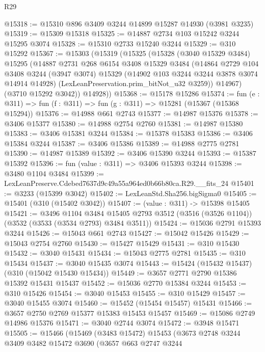 \begin{lexlean}{R29}
\begin{coremodule}
@15318 := @15310 @896 @3409 @3244 @14899 @15287 @14930 (@3981 @3235)
@15319 := @15309 @15318
@15325 := @14887 @2734 @103 @15242 @3244 @15295 @3074
@15328 := @15310 @2733 @15240 @3244
@15329 := @310 @15292
@15367 := @15303
    (@15319
      (@15325
        (@15328
          (@3040 @15329 @3484)
          @15295
          (@14887
            @2731
            @268
            @6154
            @3408
            @15329
            @3484
            (@14864
              @2729
              @104
              @3408
              @3244
              (@3947 @3074)
              @15329
              (@14902 @103 @3244 @3244 @3878 @3074 @14914 @14928)
              (LexLeanPreservation.prim_bitNot_u32 @3259))
            @14967)
          (@3710 @15292 @3042))
        @14928))
@15368 := @15178 @15286
@15374 := fun (e : @311) => fun (f : @311) => fun (g : @311) => @15281 (@15367 (@15368 @15294))
@15376 := @14988 @661 @2743
@15377 := @14987 @15376
@15378 := @3406 @15377
@15380 := @14988 @2754 @2760
@15381 := @14987 @15380
@15383 := @3406 @15381 @3244
@15384 := @15378 @15383
@15386 := @3406 @15384 @3244
@15387 := @3406 @15386
@15389 := @14988 @2775 @2781
@15390 := @14987 @15389
@15392 := @3406 @15390 @3244
@15393 := @15387 @15392
@15396 := fun (value : @311) => @3406 @15393 @3244
@15398 := @3480 @1104 @3484
@15399 := LexLeanPreserve.Cdebed7637d9c49a55a964ed0b66b80ca.R29.__fits_24
@15401 := @3233 (@15399 @3042)
@15402 := LexLeanStd.Sha256.bigSigma0
@15405 := @15401 (@310 (@15402 @3042))
@15407 := (value : @311) -> @15398 @15405
@15421 := @3496
    @1104
    @3484
    @15405
    @2793
    @3512
    (@3516 (@3526 @1104))
    (@3532 (@3533 (@3534 @2793) @3484 @3511))
@15424 := @15036 @2791 @15393 @3244
@15426 := @15043 @661 @2743
@15427 := @15042 @15426
@15429 := @15043 @2754 @2760
@15430 := @15427 @15429
@15431 := @310 @15430
@15432 := @3040 @15431
@15434 := @15043 @2775 @2781
@15435 := @310 @15434
@15437 := @3040 @15435 @3074
@15443 := @15424 (@15432 @15437) (@310 (@15042 @15430 @15434))
@15449 := @3657 @2771 @2790 @15386 @15392 @15431 @15437
@15452 := @15036 @2770 @15384 @3244
@15453 := @310 @15426
@15454 := @3040 @15453
@15455 := @310 @15429
@15457 := @3040 @15455 @3074
@15460 := @15452 (@15454 @15457) @15431
@15466 := @3657 @2750 @2769 @15377 @15383 @15453 @15457
@15469 := @15086 @2749 @14986 @15376
@15471 := @3040 @2744 @3074
@15472 := @3948 @15471
@15505 := @15466
    (@15469
      (@3483 @15472)
      @15453
      (@3673
        @2748
        @3244
        @3409
        @3482
        @15472
        @3690
        (@3657
          @663
          @2747
          @3244

\end{coremodule}
\end{lexlean}
